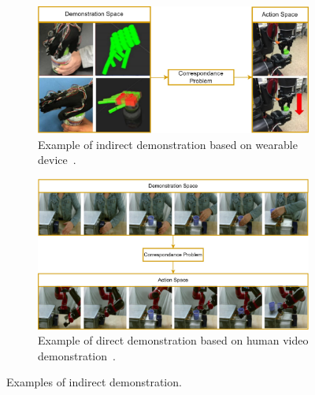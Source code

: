 \begin{figure}[tb]
     \centering
     \begin{subfigure}[b]{0.63\textwidth}
         \includegraphics[width=\textwidth]{figures/images/wearable_indirect_teaching.jpg}
         \caption{Example of indirect demonstration based on wearable device~\cite{liu2019_mirroring_without_overimitation}.}
         \label{fig:wearable_indirect}
     \end{subfigure}
     \vfill
     \vfill
     \begin{subfigure}[b]{0.63\textwidth}
         \includegraphics[width=\textwidth]{figures/images/visual_indirect_teaching.jpg}
         \caption{Example of direct demonstration based on human video demonstration~\cite{smith2019avid}.}
         \label{fig:visual_indirect}
     \end{subfigure}

    \caption{Examples of indirect demonstration.}
    \label{fig:indirect_demonstrations}
\end{figure}


